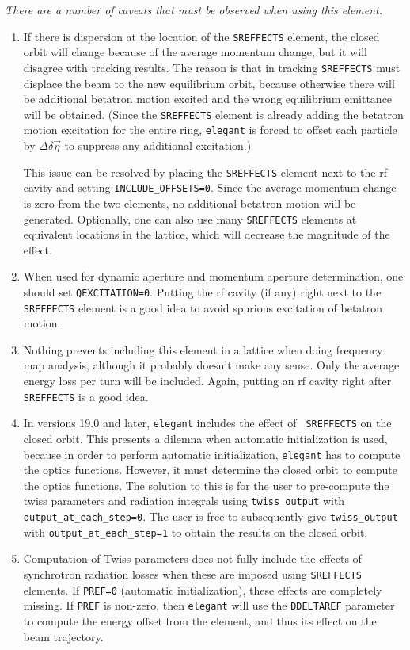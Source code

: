 {\em There are a number of caveats that must be observed when using this element.}

\begin{enumerate}

\item If there is dispersion at the location of the \verb|SREFFECTS| element,
the closed orbit will change because of the average momentum change, but it will disagree with
tracking results. The reason is that in tracking \verb|SREFFECTS| must displace the beam to the new
equilibrium orbit, because otherwise there will be additional betatron motion excited
and the wrong equilibrium emittance will be obtained.  
(Since the \verb|SREFFECTS| element is already adding the betatron motion excitation for the
entire ring, {\tt elegant} is forced to offset each particle by $\Delta \delta\vec{\eta}$
to suppress any additional excitation.)

This issue can be resolved by placing the \verb|SREFFECTS| element next to the
rf cavity and setting \verb|INCLUDE_OFFSETS=0|.  Since the average momentum change is
zero from the two elements, no additional betatron motion will be generated.
Optionally, one can also use many \verb|SREFFECTS| elements at equivalent locations in
the lattice, which will decrease the magnitude of the effect.

\item When used for dynamic aperture and momentum aperture determination,  
one should set \verb|QEXCITATION=0|.  Putting the rf cavity (if any) right next to
the \verb|SREFFECTS| element is a good idea to avoid spurious excitation of betatron
motion.

\item Nothing prevents including this element in a lattice when doing frequency map analysis, although
it probably doesn't make any sense.  Only the average energy loss per turn will be included.
Again, putting an rf cavity right after \verb|SREFFECTS| is a good idea.

\item In versions 19.0 and later, {\tt elegant} includes the effect of {\tt
SREFFECTS} on the closed orbit.  This presents a dilemna when
automatic initialization is used, because in order to perform
automatic initialization, {\tt elegant} has to compute the optics
functions.  However, it must determine the closed orbit to compute the
optics functions.  The solution to this is for the user to pre-compute
the twiss parameters and radiation integrals using \verb|twiss_output|
with \verb|output_at_each_step=0|.  The user is free to subsequently
give \verb|twiss_output| with \verb|output_at_each_step=1| to obtain
the results on the closed orbit.

\item Computation of Twiss parameters does not fully include the
effects of synchrotron radiation losses when these are imposed using
{\tt SREFFECTS} elements.  If {\tt PREF=0} (automatic initialization),
these effects are completely missing.  If {\tt PREF} is non-zero, then
{\tt elegant} will use the {\tt DDELTAREF} parameter to compute the
energy offset from the element, and thus its effect on the beam
trajectory.

\end{enumerate}
